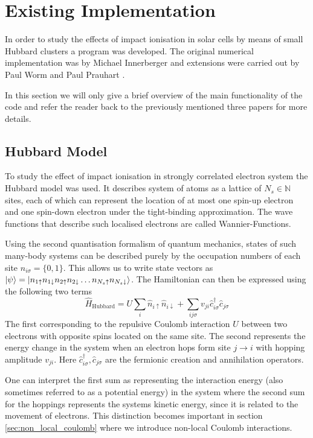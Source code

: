 \section{Existing Implementation}
In order to study the effects of impact ionisation in solar cells by means of small Hubbard clusters a program was developed. The original numerical implementation was by Michael Innerberger \cite{innerberger} and extensions were carried out by Paul Worm \cite{worm_bachelor, worm_project} and Paul Prauhart \cite{prauhart}.
\medskip

In this section we will only give a brief overview of the main functionality of the code and refer the reader back to the previously mentioned three papers for more details.

\subsection{Hubbard Model} \label{sec:hubbard_model}
To study the effect of impact ionisation in strongly correlated electron system the Hubbard model was used. It describes system of atoms as a lattice of $N_s\in \mathbb{N}$ sites, each of which can represent the location of at most one spin-up electron and one spin-down electron under the tight-binding approximation. The wave functions that describe such localised electrons are called Wannier-Functions.
\medskip

Using the second quantisation formalism of quantum mechanics, states of such many-body systems can be described purely by the occupation numbers of each site $n_{i\sigma} = \{0,1\}$. This allows us to write state vectors as $\ket{\psi}= \ket{n_{1\uparrow}n_{1\downarrow} n_{2\uparrow}n_{2\downarrow}\dots n_{N_{s}\uparrow}n_{N_{s}\downarrow}}$. The Hamiltonian can then be expressed using the following two terms
\begin{equation}
    \hat{H}_{\text{Hubbard}} = U \sum_i \hat{n}_{i\uparrow} \hat{n}_{i\downarrow} + \sum_{ij\sigma} v_{ji} \hat{c}^\dagger_{i\sigma} \hat{c}_{j\sigma}\label{eq:hubbard_hamiltonian}
\end{equation}
The first corresponding to the repulsive Coulomb interaction $U$ between two electrons with opposite spins located on the same site. The second represents the energy change in the system when an electron hops form site $j\to i$ with hopping amplitude $v_{ji}$. Here $\hat{c}_{i\sigma}^\dagger, \hat{c}_{j\sigma}$ are the fermionic creation and annihilation operators.
\medskip

One can interpret the first sum as representing the interaction energy (also sometimes referred to as a potential energy) in the system where the second sum for the hoppings represents the systems kinetic energy, since it is related to the movement of electrons. This distinction becomes important in section \ref{sec:non_local_coulomb} where we introduce non-local Coulomb interactions.



